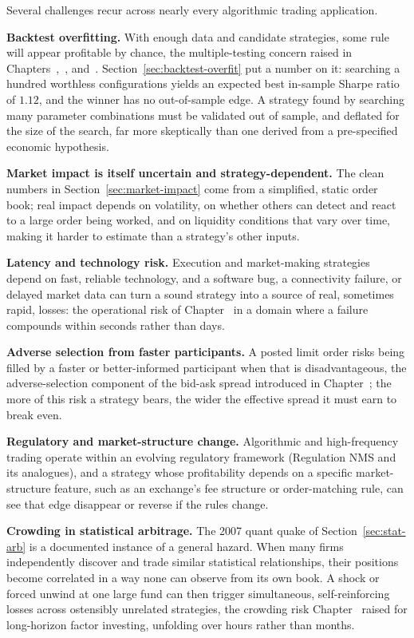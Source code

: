 \documentclass[../ai_in_finance]{subfiles}
\begin{document}
Several challenges recur across nearly every algorithmic trading application.

\textbf{Backtest overfitting.} With enough data and candidate strategies, some rule will appear profitable by chance, the multiple-testing concern raised in Chapters~,~, and~. Section~\ref{sec:backtest-overfit} put a number on it: searching a hundred worthless configurations yields an expected best in-sample Sharpe ratio of $1.12$, and the winner has no out-of-sample edge. A strategy found by searching many parameter combinations must be validated out of sample, and deflated for the size of the search, far more skeptically than one derived from a pre-specified economic hypothesis.

\textbf{Market impact is itself uncertain and strategy-dependent.} The clean numbers in Section~\ref{sec:market-impact} come from a simplified, static order book; real impact depends on volatility, on whether others can detect and react to a large order being worked, and on liquidity conditions that vary over time, making it harder to estimate than a strategy's other inputs.

\textbf{Latency and technology risk.} Execution and market-making strategies depend on fast, reliable technology, and a software bug, a connectivity failure, or delayed market data can turn a sound strategy into a source of real, sometimes rapid, losses: the operational risk of Chapter~ in a domain where a failure compounds within seconds rather than days.

\textbf{Adverse selection from faster participants.} A posted limit order risks being filled by a faster or better-informed participant when that is disadvantageous, the adverse-selection component of the bid-ask spread introduced in Chapter~; the more of this risk a strategy bears, the wider the effective spread it must earn to break even.

\textbf{Regulatory and market-structure change.} Algorithmic and high-frequency trading operate within an evolving regulatory framework (Regulation NMS and its analogues), and a strategy whose profitability depends on a specific market-structure feature, such as an exchange's fee structure or order-matching rule, can see that edge disappear or reverse if the rules change.

\textbf{Crowding in statistical arbitrage.} The 2007 quant quake of Section~\ref{sec:stat-arb} is a documented instance of a general hazard. When many firms independently discover and trade similar statistical relationships, their positions become correlated in a way none can observe from its own book. A shock or forced unwind at one large fund can then trigger simultaneous, self-reinforcing losses across ostensibly unrelated strategies, the crowding risk Chapter~ raised for long-horizon factor investing, unfolding over hours rather than months.
\end{document}
